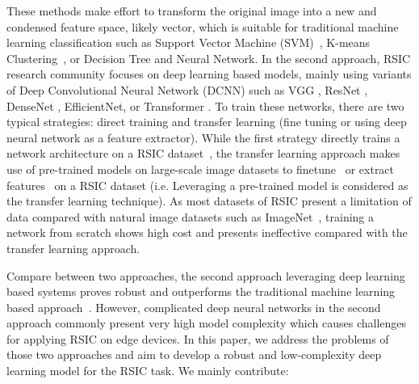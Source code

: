 \documentclass[sigconf]{acmart}
\begin{document}
These methods make effort to transform the original image into a new and condensed feature space, likely vector, which is suitable for traditional machine learning classification such as  Support Vector Machine (SVM)~\cite{yang2010bag, elmannai2016new}, K-means Clustering~\cite{zheng2008k}, or Decision Tree and Neural Network\cite{du2012multiple}. In the second approach, RSIC research community focuses on deep learning based models, mainly using variants of Deep Convolutional Neural Network (DCNN) such as VGG \cite{ye2021lightweight}, ResNet \cite{shabbir2021satellite}, DenseNet \cite{tong2020channel}, EfficientNet\cite{zhang2020transfer}, or Transformer \cite{zhang2021trs}. To train these networks, there are two typical strategies\cite{nogueira2017towards}: direct training and transfer learning (fine tuning or using deep neural network as a feature extractor). While the first strategy directly trains a network architecture on a RSIC dataset~\cite{pham2022remote}, the transfer learning approach makes use of pre-trained models on large-scale image datasets to finetune~\cite{hu2015transferring, wang2022empirical, shabbir2021satellite} or extract features~\cite{minetto2019hydra, zhao2020remote, li2020augmentation, zhang2021best, li2021gated, pham2022remote} on a RSIC dataset (i.e. Leveraging a pre-trained model is considered as the transfer learning technique).
As most datasets of RSIC present a limitation of data compared with natural image datasets such as ImageNet~\cite{imagenet_dataset}, training a network from scratch shows high cost and presents ineffective compared with the transfer learning approach.

Compare between two approaches, the second approach leveraging deep learning based systems proves robust and outperforms the traditional machine learning based approach~\cite{mehmood2022remote}. 
However, complicated deep neural networks in the second approach commonly present very high model complexity which causes challenges for applying RSIC on edge devices. 
In this paper, we address the problems of those two approaches and aim to develop a robust and low-complexity deep learning model for the RSIC task. We mainly contribute: 
\end{document}
